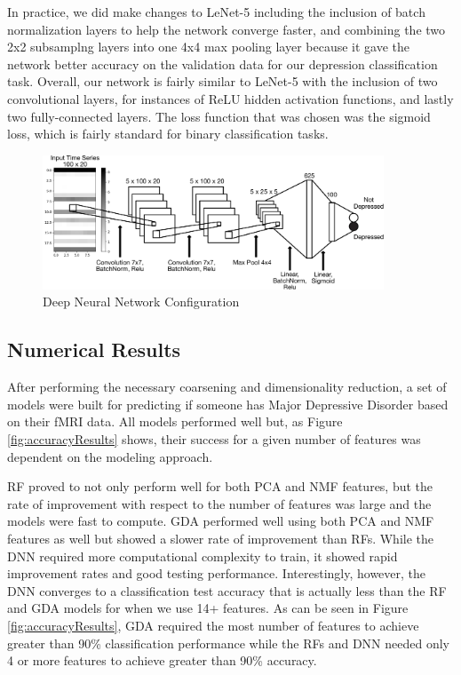 \documentclass{article}[12pt]
\begin{document}
   In practice, we did make changes to LeNet-5 including the inclusion of batch normalization layers to help the network converge faster, and combining the two 2x2 subsamplng layers into one 4x4 max pooling layer because it gave the network better accuracy on the validation data for our depression classification task. Overall, our network is fairly similar to LeNet-5 with the inclusion of two convolutional layers, for instances of ReLU hidden activation functions, and lastly two fully-connected layers. The loss function that was chosen was the sigmoid loss, which is fairly standard for binary classification tasks.  
   
   \begin{figure}[!htb]
   	\centering
   	\includegraphics[width=4in]{DNN_diagram_annotated.pdf}
   	\caption{Deep Neural Network Configuration}
   	\label{fig:dnnConfig}
   \end{figure}
   
   
   \subsection{Numerical Results}
   After performing the necessary coarsening and dimensionality reduction, a set of models were built for predicting if someone has Major Depressive Disorder based on their fMRI data.  All models performed well but, as Figure \ref{fig:accuracyResults} shows, their success for a given number of features was dependent on the modeling approach. 
   
   RF proved to not only perform well for both PCA and NMF features, but the rate of improvement with respect to the number of features was large and the models were fast to compute. GDA performed well using both PCA and NMF features as well but showed a slower rate of improvement than RFs. While the DNN required more computational complexity to train, it showed rapid improvement rates and good testing performance. Interestingly, however, the DNN converges to a classification test accuracy that is actually less than the RF and GDA models for when we use 14+ features. As can be seen in Figure \ref{fig:accuracyResults}, GDA required the most number of features to achieve greater than 90\% classification performance while the RFs and DNN needed only 4 or more features to achieve greater than 90\% accuracy.
   
\end{document}
